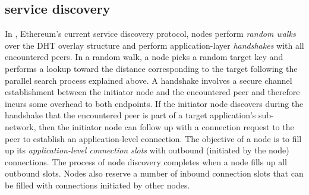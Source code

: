





\subsection{\discv service discovery}
\label{sec:background:discv4}

In \discv, Ethereum's current service discovery protocol, nodes perform \textit{random walks} over the DHT overlay structure and perform application-layer \emph{handshakes} with all encountered peers.
In a random walk, a node picks a random target key and performs a lookup toward the distance corresponding to the target following the parallel search process explained above. 
A handshake involves a secure channel establishment between the initiator node and the encountered peer and therefore incurs some overhead to both endpoints.
If the initiator node discovers during the handshake that the encountered peer is part of a target application's sub-network, then the initiator node can follow up with a connection request to the peer to establish an application-level connection.
The objective of a node is to fill up its \textit{application-level connection slots} with outbound (\ie initiated by the node) connections.
The process of node discovery completes when a node fills up all outbound slots.
Nodes also reserve a number of inbound connection slots that can be filled with connections initiated by other nodes. 

